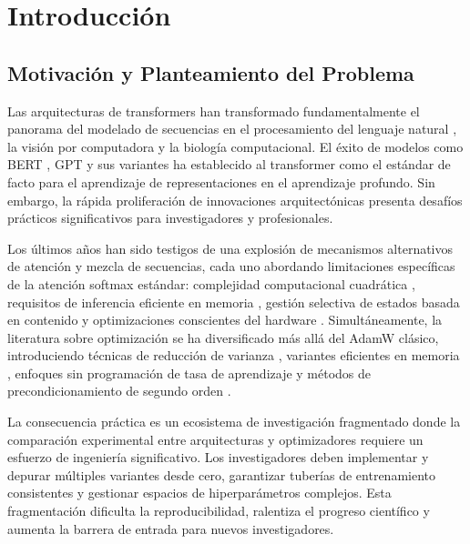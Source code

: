 \section{Introducción}

\subsection{Motivación y Planteamiento del Problema}

Las arquitecturas de transformers han transformado fundamentalmente el panorama del modelado de secuencias en el procesamiento del lenguaje natural \citep{vaswani_attention_2017}, la visión por computadora y la biología computacional. El éxito de modelos como BERT \citep{devlin_bert_2019}, GPT y sus variantes ha establecido al transformer como el estándar de facto para el aprendizaje de representaciones en el aprendizaje profundo. Sin embargo, la rápida proliferación de innovaciones arquitectónicas presenta desafíos prácticos significativos para investigadores y profesionales.

Los últimos años han sido testigos de una explosión de mecanismos alternativos de atención y mezcla de secuencias, cada uno abordando limitaciones específicas de la atención softmax estándar: complejidad computacional cuadrática \citep{child_sparse_transformer_2019}, requisitos de inferencia eficiente en memoria \citep{sun_retentive_2023,gu_mamba_2023}, gestión selectiva de estados basada en contenido \citep{behrouz_titans_2025} y optimizaciones conscientes del hardware \citep{ramapuram_theory_2024}. Simultáneamente, la literatura sobre optimización se ha diversificado más allá del AdamW clásico, introduciendo técnicas de reducción de varianza \citep{xie_adan_2022,pagliardini_ademamix_2024,yuan_mars_2024}, variantes eficientes en memoria \citep{shazeer_adafactor_2018,zhao_galore_2024}, enfoques sin programación de tasa de aprendizaje \citep{defazio_road_2024} y métodos de precondicionamiento de segundo orden \citep{gupta_shampoo_2018,vyas_soap_2024}.

La consecuencia práctica es un ecosistema de investigación fragmentado donde la comparación experimental entre arquitecturas y optimizadores requiere un esfuerzo de ingeniería significativo. Los investigadores deben implementar y depurar múltiples variantes desde cero, garantizar tuberías de entrenamiento consistentes y gestionar espacios de hiperparámetros complejos. Esta fragmentación dificulta la reproducibilidad, ralentiza el progreso científico y aumenta la barrera de entrada para nuevos investigadores.

